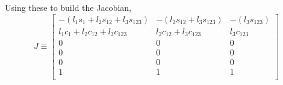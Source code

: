 \documentclass[12pt]{article}
\begin{document}
Using these to build the Jacobian,
\[
  J \equiv
  \begin{bmatrix}
    -(l_1s_1 + l_2s_{12} + l_3s_{123}) & -(l_2s_{12} + l_3s_{123}) & -(l_3s_{123})\\
    l_1c_1 + l_2c_{12} + l_3c_{123} & l_2c_{12} + l_3c_{123} & l_3c_{123}\\
    0 & 0 & 0 \\
    0 & 0 & 0 \\
    0 & 0 & 0 \\
    1 & 1 & 1 \\
  \end{bmatrix}
\]

\pagebreak

\section{}

\pagebreak
\end{document}
